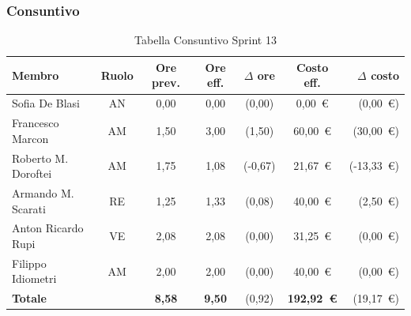 \subsubsection{Consuntivo}
\begin{table}[H]
    \centering
    \renewcommand{\arraystretch}{1.3}
    \begin{tabularx}{\textwidth}{|X|c|c|c|c|c|r|}
        \hline
        \textbf{Membro} & \textbf{Ruolo} & \textbf{Ore prev.} &
        \textbf{Ore eff.} & \textbf{$\Delta$ ore} &
        \textbf{Costo eff.} & \textbf{$\Delta$ costo} \\
        \hline
        Sofia De Blasi       & AN & 0,00 & 0,00 & {\color{green}(0,00)}  & 0{,}00~\euro & {\color{green}(0{,}00~\euro)} \\
        Francesco Marcon     & AM & 1,50 & 3,00 & {\color{red}(1,50)} & 60{,}00~\euro  & {\color{red}(30{,}00~\euro)} \\
        Roberto M. Doroftei  & AM & 1,75 & 1,08 & {\color{green}(-0,67)} & 21{,}67~\euro  & {\color{green}(-13{,}33~\euro)} \\
        Armando M. Scarati   & RE & 1,25 & 1,33 & {\color{red}(0,08)}  & 40{,}00~\euro  & {\color{red}(2{,}50~\euro)} \\
        Anton Ricardo Rupi   & VE & 2,08 & 2,08 & {\color{green}(0,00)}  & 31{,}25~\euro & {\color{green}(0{,}00~\euro)} \\
        Filippo Idiometri    & AM & 2,00 & 2,00 & {\color{green}(0,00)} & 40{,}00~\euro  & {\color{green}(0{,}00~\euro)} \\
        \hline
        \textbf{Totale} & & \textbf{8,58} & \textbf{9,50} & {\color{red}(0,92)} & \textbf{192{,}92~\euro} & {\color{red}(19{,}17~\euro)} \\
        \hline
    \end{tabularx}
    \caption{Tabella Consuntivo Sprint 13}
\end{table}

